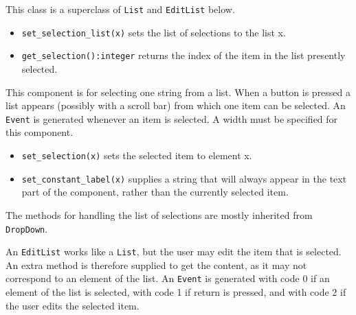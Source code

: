 \medskip{}

This class is a superclass of  \texttt{List} and  \texttt{EditList} below.

\begin{itemize}
\item\noindent\texttt{set\_selection\_list(x)} sets the list of selections to the list
x.

\item\noindent\texttt{get\_selection():integer} returns the index of the item in the
list presently selected.
\end{itemize}

\medskip{}

This component is for selecting one string from a list. When
a button is pressed a list appears (possibly with a scroll bar) from
which one item can be selected. An  \texttt{Event} is generated whenever an item
is selected. A width must be specified for this component.

\begin{itemize}
\item\noindent\texttt{set\_selection(x)} sets the selected item to element x.

\item\noindent\texttt{set\_constant\_label(x)} supplies a string that will always appear in
the text part of the component, rather than the currently selected item.
\end{itemize}

The methods for handling the list of selections are mostly
inherited from \texttt{DropDown}.


\medskip{}

An \texttt{EditList} works like a \texttt{List}, but the user may
edit the item that is selected. An extra method is therefore supplied
to get the content, as it may not correspond to an element of the list.
An  \texttt{Event} is generated with code 0 if an element of the list is
selected, with code 1 if return is pressed, and with code 2 if the user
edits the selected item.

